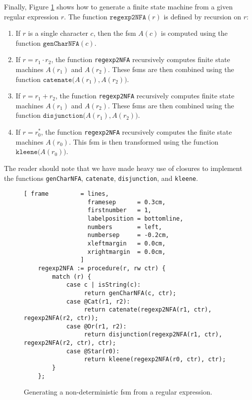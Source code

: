Finally, Figure \ref{fig:regexp2NFA.stlx} shows how to generate a finite state machine
from a given regular expression $r$.  The function $\texttt{regexp2NFA}(r)$ is defined by
recursion on $r$:
\begin{enumerate}
\item If $r$ is a single character $c$, then the fsm $A(c)$ is computed using
      the function $\texttt{genCharNFA}(c)$.
\item If $r = r_1 \cdot r_2$, the function \texttt{regexp2NFA} recursively computes
      finite state machines $A(r_1)$ and $A(r_2)$.  These fsms are then combined
      using the function $\texttt{catenate}\bigr(A(r_1), A(r_2)\bigr)$.
\item If $r = r_1 + r_2$, the function \texttt{regexp2NFA} recursively computes
      finite state machines $A(r_1)$ and $A(r_2)$.  These fsms are then combined
      using the function $\texttt{disjunction}\bigr(A(r_1), A(r_2)\bigr)$.
\item If $r = r_0^*$, the function \texttt{regexp2NFA} recursively computes
      the finite state machines $A(r_0)$.  This fsm is then transformed
      using the function $\texttt{kleene}\bigr(A(r_0)\bigr)$.
\end{enumerate}
The reader should note that we have made heavy use of closures to implement the functions
\texttt{genCharNFA}, \texttt{catenate}, \texttt{disjunction}, and \texttt{kleene}.

\begin{figure}[!ht]
\centering
\begin{Verbatim}[ frame         = lines, 
                  framesep      = 0.3cm, 
                  firstnumber   = 1,
                  labelposition = bottomline,
                  numbers       = left,
                  numbersep     = -0.2cm,
                  xleftmargin   = 0.0cm,
                  xrightmargin  = 0.0cm,
                ]
    regexp2NFA := procedure(r, rw ctr) {
        match (r) {
            case c | isString(c): 
                 return genCharNFA(c, ctr);
            case @Cat(r1, r2):
                 return catenate(regexp2NFA(r1, ctr), regexp2NFA(r2, ctr)); 
            case @Or(r1, r2):
                 return disjunction(regexp2NFA(r1, ctr), regexp2NFA(r2, ctr), ctr);
            case @Star(r0):
                 return kleene(regexp2NFA(r0, ctr), ctr);
        }
    };
\end{Verbatim}
\vspace*{-0.3cm}
\caption{Generating a non-deterministic fsm from a regular expression.}
\label{fig:regexp2NFA.stlx}
\end{figure}

